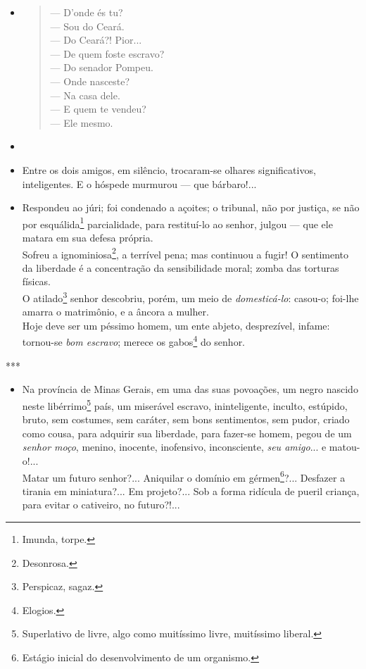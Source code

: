 \begin{itemize}
\item
  \begin{quote}
  --- D'onde és tu?\\
  --- Sou do Ceará.\\
  --- Do Ceará?! Pior...\\
  --- De quem foste escravo?\\
  --- Do senador Pompeu.\\
  --- Onde nasceste?\\
  --- Na casa dele.\\
  --- E quem te vendeu?\\
  --- Ele mesmo.
  \end{quote}
\item
\item
  Entre os dois amigos, em silêncio, trocaram-se olhares significativos,
  inteligentes. E o hóspede murmurou --- que bárbaro!...
\item
  Respondeu ao júri; foi condenado a açoites; o tribunal, não por
  justiça, se não por esquálida\footnote{Imunda, torpe.} parcialidade,
  para restituí-lo ao senhor, julgou --- que ele matara em sua defesa
  própria.\\
  Sofreu a ignominiosa\footnote{Desonrosa.}, a terrível pena; mas
  continuou a fugir! O sentimento da liberdade é a concentração da
  sensibilidade moral; zomba das torturas físicas.\\
  O atilado\footnote{Perspicaz, sagaz.} senhor descobriu, porém, um
  meio de \emph{domesticá-lo}: casou-o; foi-lhe amarra o matrimônio, e a
  âncora a mulher.\\
  Hoje deve ser um péssimo homem, um ente abjeto, desprezível, infame:
  tornou-se \emph{bom escravo}; merece os gabos\footnote{Elogios.} do
  senhor.
\end{itemize}

***

\begin{itemize}
\item
  Na província de Minas Gerais, em uma das suas povoações, um negro
  nascido neste libérrimo\footnote{Superlativo de livre, algo como
    muitíssimo livre, muitíssimo liberal.} país, um miserável escravo,
  ininteligente, inculto, estúpido, bruto, sem costumes, sem caráter,
  sem bons sentimentos, sem pudor, criado como cousa, para adquirir sua
  liberdade, para fazer-se homem, pegou de um \emph{senhor moço},
  menino, inocente, inofensivo, inconsciente, \emph{seu amigo}... e
  matou-o!...\\
  Matar um futuro senhor?... Aniquilar o domínio em gérmen\footnote{
    Estágio inicial do desenvolvimento de um organismo.}?... Desfazer a
  tirania em miniatura?... Em projeto?... Sob a forma ridícula de pueril
  criança, para evitar o cativeiro, no futuro?!...
\end{itemize}

